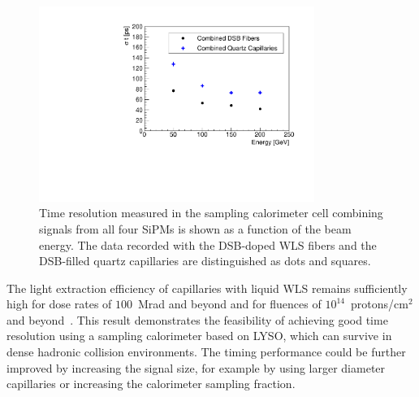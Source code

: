 \begin{figure}[!htb]
\centering
\includegraphics[width=0.8\textwidth]{figures/ShashlikTimeResolutionCombinedChannelVsEnergy.pdf}
\caption{\label{TimeResolutionCombined}  Time resolution measured in the sampling calorimeter cell combining signals from all four  
SiPMs is shown as a function of the beam energy.  The data recorded with the DSB-doped WLS fibers and the
DSB-filled quartz capillaries are distinguished as dots and squares.}
\end{figure}



The light extraction efficiency of capillaries with liquid WLS remains
sufficiently high for dose rates of $100$~Mrad and beyond and for fluences of
$10^{14}$~protons/$\mathrm{cm}^{2}$ and beyond~\cite{shashlik2}. This result
demonstrates the feasibility of achieving good time resolution using a sampling
calorimeter based on LYSO, which can survive in dense hadronic collision
environments. The timing performance could be further improved by increasing
the signal size, for example by using larger diameter capillaries or increasing
the calorimeter sampling fraction. 

